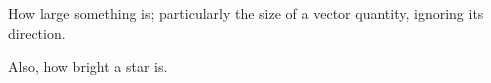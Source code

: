 How large something is; particularly the size of a vector quantity, ignoring
its direction.
\par
Also, how bright a star is.